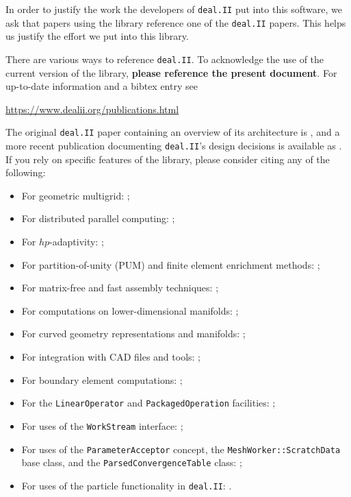 \documentclass{ansarticle-preprint}
\newcommand{\specialword}[1]{\texttt{#1}}
\newcommand{\dealii}{{\specialword{deal.II}}\xspace}
\begin{document}
In order to justify the work the developers of \dealii{} put into this
software, we ask that papers using the library reference one of the
\dealii{} papers. This helps us justify the effort we put into this library.

There are various ways to reference \dealii{}. To acknowledge the use of
the current version of the library, \textbf{please reference the present
  document}. For up-to-date information and a bibtex entry
see
\begin{center}
  \url{https://www.dealii.org/publications.html}
\end{center}

The original \dealii{} paper containing an overview of its
architecture is \cite{BangerthHartmannKanschat2007}, and a more recent
publication documenting \dealii{}'s design decisions is available as \cite{dealII2020design}. If you rely on
specific features of the library, please consider citing any of the
following:
\begin{multicols}{2}
  \vspace*{-36pt}
  \begin{itemize}[leftmargin=4mm]
    \item For geometric multigrid: \cite{Kanschat2004,JanssenKanschat2011,ClevengerHeisterKanschatKronbichler2019, munch2022gc};
    \item For distributed parallel computing: \cite{BangerthBursteddeHeisterKronbichler11};
    \item For $hp$-adaptivity: \cite{BangerthKayserHerold2007,fehling2022};
    \item For partition-of-unity (PUM) and finite element enrichment methods:
           \cite{Davydov2016};
    \item For matrix-free and fast assembly techniques:
          \cite{KronbichlerKormann2012,KronbichlerKormann2019};
    \item For computations on lower-dimensional manifolds:
          \cite{DeSimoneHeltaiManigrasso2009};
    \item For curved geometry representations and manifolds:
          \cite{HeltaiBangerthKronbichlerMola2019};
    \item For integration with CAD files and tools:
          \cite{HeltaiMola2015};
    \item For boundary element computations:
          \cite{GiulianiMolaHeltai-2018-a};
    \item For the \texttt{LinearOperator} and
      \texttt{Packaged\-Operation} facilities:
          \cite{MaierBardelloniHeltai-2016-a,MaierBardelloniHeltai-2016-b};
    \item For uses of the \texttt{WorkStream} interface:
          \cite{TKB16};
    \item For uses of the \texttt{ParameterAcceptor} concept, the
          \texttt{MeshWorker::ScratchData} base class, and the
          \texttt{ParsedConvergenceTable} class:
          \cite{SartoriGiulianiBardelloni-2018-a};
    \item For uses of the particle functionality in \dealii{}:
          \cite{GLHPB18}.
          \vfill\null
  \end{itemize}
\end{multicols}
\end{document}
